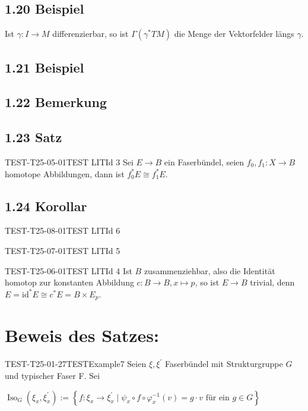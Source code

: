 \subsection*{1.20 Beispiel}
Ist $\gamma: I \rightarrow M$ differenzierbar, so ist $\Gamma\left(\gamma^{*} T M\right)$ die Menge der Vektorfelder längs $\gamma$.


\subsection*{1.21 Beispiel}

\subsection*{1.22 Bemerkung}

\subsection*{1.23 Satz}
\begin{PROOF}{TEST-T25-05-01}{TEST LITId 3}
Sei $E \rightarrow B$ ein Faserbündel, seien $f_{0}, f_{1}: X \rightarrow B$ homotope Abbildungen, dann ist $f_{0}^{*} E \cong f_{1}^{*} E$.
\end{PROOF}

\subsection*{1.24 Korollar}
\begin{CTypEnum.EXA}{TEST-T25-08-01}{TEST LITId 6}
\begin{CTypEnum.EXA}{TEST-T25-07-01}{TEST LITId 5}
\begin{CTypEnum.PROOF}{TEST-T25-06-01}{TEST LITId 4}
Ist $B$ zusammenziehbar, also die Identität homotop zur konstanten Abbildung $c: B \rightarrow B, x \mapsto p$, so ist $E \rightarrow B$ trivial, denn $E=\mathrm{id}^{*} E \cong c^{*} E=B \times E_{p}$.
\end{CTypEnum.PROOF}
\end{CTypEnum.EXA}
\end{CTypEnum.EXA}

\section*{Beweis des Satzes:}
\begin{EXA}{TEST-T25-01-27}{TESTExample7}
Seien $\xi, \xi^{\prime}$ Faserbündel mit Strukturgruppe $G$ und typischer Faser F. Sei

$
\operatorname{Iso}_{G}\left(\xi_{x}, \xi_{x}^{\prime}\right):=\left\{f: \xi_{x} \rightarrow \xi_{x}^{\prime} \mid \psi_{x} \circ f \circ \varphi_{x}^{-1}(v)=g \cdot v \text { für ein } g \in G\right\}
$
\end{EXA}

